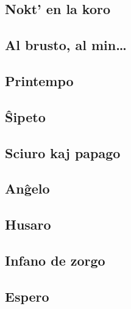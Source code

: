 \documentclass[a5paper,11pt,openany,twoside]{book}
\begin{document}

\subsection{Nokt' en la koro}
\label{noktenlakoro}


\subsection{Al brusto, al min\dots}
\label{albrusto}



\subsection{Printempo}
\label{printempo}


\subsection{\^Sipeto}
\label{sxipeto}


\subsection{Sciuro kaj papago}
\label{sciuro}


\subsection{An\^gelo}
\label{angxelo}


\subsection{Husaro}
\label{husaro}


\subsection{Infano de zorgo}
\label{infano}


\subsection{Espero}
\label{espero}

\end{document}

